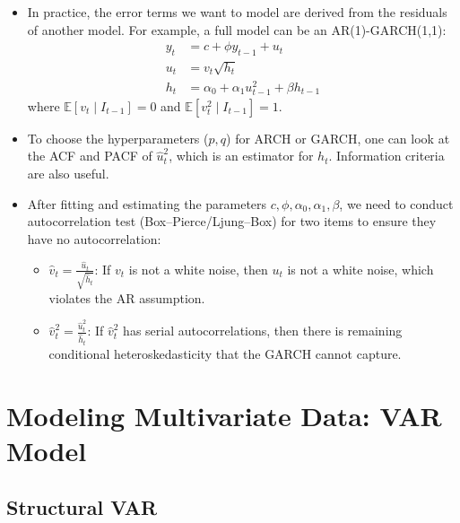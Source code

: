 \documentclass[notitlepage]{article}
\begin{document}
\begin{itemize}
    \item In practice, the error terms we want to model are derived from the residuals of another model. For example, a full model can be an AR(1)-GARCH(1,1):
    \begin{align*}
        y_t &= c + \phi y_{t-1} + u_t \\
        u_t &= v_t \sqrt{h_t} \\
        h_t &= \alpha_0 + \alpha_1 u^2_{t-1} + \beta h_{t-1}
    \end{align*}
    where \(\mathbb{E}[v_t \mid I_{t-1}] = 0\) and \(\mathbb{E}[v_t^2 \mid I_{t-1}] = 1\).

    \item To choose the hyperparameters (\(p,q\)) for ARCH or GARCH, one can look at the ACF and PACF of \(\hat{u}_t^2\), which is an estimator for \(h_t\). Information criteria are also useful.

    \item After fitting and estimating the parameters \(c, \phi, \alpha_0, \alpha_1, \beta\), we need to conduct autocorrelation test (Box–Pierce/Ljung–Box) for two items to ensure they have no autocorrelation:
    \begin{itemize}
        \item \(\hat{v}_t = \frac{\hat{u}_t}{\sqrt{\hat{h}_t}}\): If \(v_t\) is not a white noise, then \(u_t\) is not a white noise, which violates the AR assumption.
        \item \(\hat{v}_t^2 = \frac{\hat{u}^2_t}{\hat{h}_t}\): If \(\hat{v}_t^2\) has serial autocorrelations, then there is remaining conditional heteroskedasticity that the GARCH cannot capture.
    \end{itemize}
\end{itemize}

\section{Modeling Multivariate Data: VAR Model}

\subsection{Structural VAR}
\end{document}
